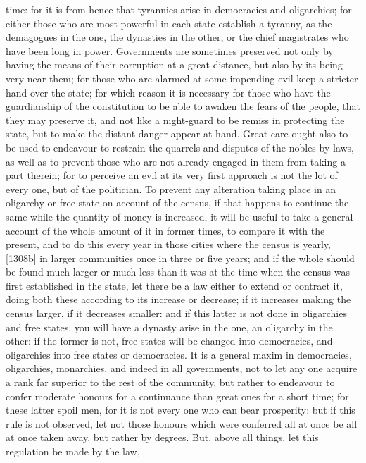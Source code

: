 time: for it is from hence that tyrannies arise in democracies and
oligarchies; for either those who are most powerful in each state
establish a tyranny, as the demagogues in the one, the dynasties in the
other, or the chief magistrates who have been long in power. Governments
are sometimes preserved not only by having the means of their corruption
at a great distance, but also by its being very near them; for those who
are alarmed at some impending evil keep a stricter hand over the state;
for which reason it is necessary for those who have the guardianship of
the constitution to be able to awaken the fears of the people, that they
may preserve it, and not like a night-guard to be remiss in protecting the
state, but to make the distant danger appear at hand. Great care ought
also to be used to endeavour to restrain the quarrels and disputes of the
nobles by laws, as well as to prevent those who are not already engaged in
them from taking a part therein; for to perceive an evil at its very first
approach is not the lot of every one, but of the politician. To prevent
any alteration taking place in an oligarchy or free state on account of
the census, if that happens to continue the same while the quantity of
money is increased, it will be useful to take a general account of the
whole amount of it in former times, to compare it with the present, and to
do this every year in those cities where the census is yearly, [1308b] in
larger communities once in three or five years; and if the whole should be
found much larger or much less than it was at the time when the census was
first established in the state, let there be a law either to extend or
contract it, doing both these according to its increase or decrease; if it
increases making the census larger, if it decreases smaller: and if this
latter is not done in oligarchies and free states, you will have a dynasty
arise in the one, an oligarchy in the other: if the former is not, free
states will be changed into democracies, and oligarchies into free states
or democracies. It is a general maxim in democracies, oligarchies,
monarchies, and indeed in all governments, not to let any one acquire a
rank far superior to the rest of the community, but rather to endeavour to
confer moderate honours for a continuance than great ones for a short
time; for these latter spoil men, for it is not every one who can bear
prosperity: but if this rule is not observed, let not those honours which
were conferred all at once be all at once taken away, but rather by
degrees. But, above all things, let this regulation be made by the law,
